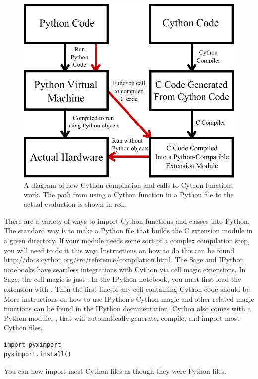 \begin{figure}
\includegraphics[width=\textwidth]{compilation.pdf}
\caption{A diagram of how Cython compilation and calls to Cython functions work.
The path from using a Cython function in a Python file to the actual evaluation is shown in red.}
\label{cython:compilation}
\end{figure}

There are a variety of ways to import Cython functions and classes into Python.
The standard way is to make a Python file that builds the C extension module in a given directory.
If your module needs some sort of a complex compilation step, you will need to do it this way.
Instructions on how to do this can be found \url{http://docs.cython.org/src/reference/compilation.html}.
The Sage and IPython notebooks have seamless integrations with Cython via cell magic extensions.
In Sage, the cell magic is just .
In the IPython notebook, you must first load the extension with .
Then the first line of any cell containing Cython code should be .
More instructions on how to use IPython's Cython magic and other related magic functions can be found in the IPython documentation.
Cython also comes with a Python module, , that will automatically generate, compile, and import most Cython files.
\begin{lstlisting}
import pyximport
pyximport.install()
\end{lstlisting}
You can now import most Cython files as though they were Python files.

